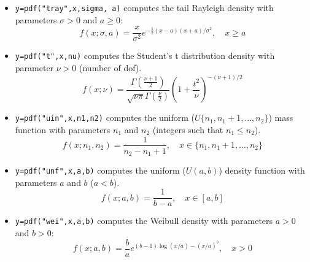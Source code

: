 \begin{mandescription}
\begin{itemize}
\item {} \verb!y=pdf("tray",x,sigma, a)! computes
  the tail Rayleigh density with parameters $\sigma > 0$ and $a \ge 0$:
$$
     f(x; \sigma, a) = \frac{x}{\sigma^2} e^{-\frac{1}{2} (x-a)(x+a)/\sigma^2 }, \quad x \ge a
$$


\item {} \verb!y=pdf("t",x,nu)! computes
  the Student's t distribution density with parameter $\nu > 0$
  (number of dof).
$$
    f(x; \nu) = \frac{\Gamma(\frac{\nu+1}{2})}{\sqrt{\nu \pi}\Gamma(\frac{\nu}{2})} \left( 1 + \frac{t^2}{\nu} \right)^{-(\nu+1)/2} 
$$


\item {} \verb!y=pdf("uin",x,n1,n2)! computes
  the  uniform ($U\{n_1,n_1+1,\dots,n_2\}$) mass function with parameters $n_1$ and $n_2$
  (integers such that $n_1 \le n_2$).
$$
     f(x; n_1, n_2) = \frac{ 1 }{ n_2 - n_1 + 1},  \quad x \in \{n_1,n_1+1,\dots,n_2\}
$$

\item {} \verb!y=pdf("unf",x,a,b)! computes
  the  uniform ($U(a,b)$) density function with parameters $a$ and $b$ ($a < b$).
$$
     f(x; a, b) = \frac{1}{b-a}, \quad x \in [a,b]
$$


\item {} \verb!y=pdf("wei",x,a,b)! computes the Weibull
  density with parameters $a > 0$ and $b > 0$:
$$
     f(x; a, b) = \frac{b}{a} e^{ (b-1)\log(x/a) - (x/a)^b }, \quad x > 0
$$

\end{itemize}

\end{mandescription}


